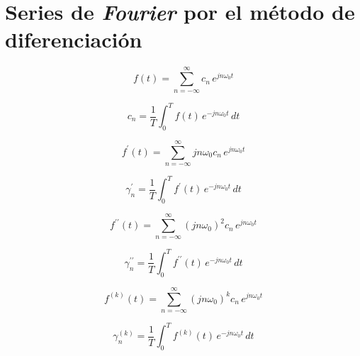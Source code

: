 \section{Series de \emph{Fourier} por el método de diferenciación}
\begin{minipage}{.5\linewidth}
    \begin{equation*}
        f(t)=\sum_{n=-\infty}^{\infty}c_n\,e^{jn\omega_0 t}
    \end{equation*}
\end{minipage}
\begin{minipage}{.5\linewidth}
    \begin{equation*}
        c_n=\frac{1}{T}\int_0^T f(t)\,e^{-jn\omega_0 t}\,dt
    \end{equation*}
\end{minipage}
\begin{minipage}{.5\linewidth}
    \begin{equation*}
        f^\prime(t)=\sum_{n=-\infty}^{\infty}jn\omega_0 c_n\,e^{jn\omega_0 t}
    \end{equation*}
\end{minipage}
\begin{minipage}{.5\linewidth}
    \begin{equation*}
        \gamma^\prime_n=\frac{1}{T}\int_0^T f^\prime(t)\,e^{-jn\omega_0 t}\,dt
    \end{equation*}
\end{minipage}
\begin{minipage}{.5\linewidth}
    \begin{equation*}
        f^{\prime\prime}(t)
            =\sum_{n=-\infty}^{\infty}{(jn\omega_0)}^2 c_n\,e^{jn\omega_0 t}
    \end{equation*}
\end{minipage}
\begin{minipage}{.5\linewidth}
    \begin{equation*}
        \gamma^{\prime\prime}_n
            =\frac{1}{T}\int_0^T f^{\prime\prime}(t)\,e^{-jn\omega_0 t}\,dt
    \end{equation*}
\end{minipage}
\begin{minipage}{.5\linewidth}
    \begin{equation*}
        f^{(k)}(t)
            =\sum_{n=-\infty}^{\infty}{(jn\omega_0)}^k c_n\,e^{jn\omega_0 t}
    \end{equation*}
\end{minipage}
\begin{minipage}{.5\linewidth}
    \begin{equation*}
        \gamma^{(k)}_n
            =\frac{1}{T}\int_0^T f^{(k)}(t)\,e^{-jn\omega_0 t}\,dt
    \end{equation*}
\end{minipage}

